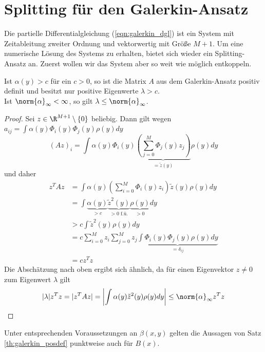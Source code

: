 \section{Splitting für den Galerkin-Ansatz}
Die partielle Differentialgleichung (\ref{eqn:galerkin_dgl}) ist ein System mit Zeitableitung zweiter Ordnung und vektorwertig mit Größe $M+1$. Um eine numerische Lösung des Systems zu erhalten, bietet sich wieder ein Splitting-Ansatz an. Zuerst wollen wir das System aber so weit wie möglich entkoppeln.
\begin{maththeorem}
\label{th:galerkin_posdef}
Ist $\alpha(y)>c$ für ein $c>0$, so ist die Matrix $A$ aus dem Galerkin-Ansatz positiv definit und besitzt nur positive Eigenwerte $\lambda>c$.\\
Ist $\norm{\alpha}_\infty < \infty$, so gilt $\lambda\le \norm{\alpha}_\infty$.
\end{maththeorem}
\begin{proof}
Sei $z\in\R^{M+1}\setminus \lbrace 0\rbrace$ beliebig. Dann gilt wegen $a_{ij}=\int \alpha(y)\Phi_i(y)\Phi_j(y)\rho(y)dy$
\[(Az)_i=\int \alpha(y)\Phi_i(y)\underbrace{\left(\sum_{j=0}^M\Phi_j(y)z_j\right)}_{=\tilde{z}(y)}\rho(y)dy\]
und daher
\begin{align*}
z^TAz&=\int \alpha(y)\left(\sum_{i=0}^M\Phi_i(y)z_i\right)\tilde{z}(y)\rho(y)dy\\
&=\int\underbrace{\alpha(y)}_{>c}\underbrace{\tilde{z}^2(y)}_{>0 \text{ f.ü.}}\underbrace{\rho(y)}_{>0}dy\\
&>c\int \tilde{z}^2(y)\rho(y)dy\\
&=c\sum_{i=0}^Mz_i\sum_{j=0}^Mz_j\underbrace{\int \Phi_i(y)\Phi_j(y)\rho(y)dy}_{=\delta_{ij}}\\
&=cz^Tz
\end{align*}
Die Abschätzung nach oben ergibt sich ähnlich, da für einen Eigenvektor $z\neq 0$ zum Eigenwert $\lambda$ gilt
\[|\lambda| z^Tz=|z^TAz|=\left|\int \alpha(y)\tilde{z}^2(y)\rho(y)dy\right|\leq \norm{\alpha}_\infty z^Tz\]
\end{proof}
Unter entsprechenden Voraussetzungen an $\beta(x,y)$ gelten die Aussagen von Satz \ref{th:galerkin_posdef} punktweise auch für $B(x)$.

